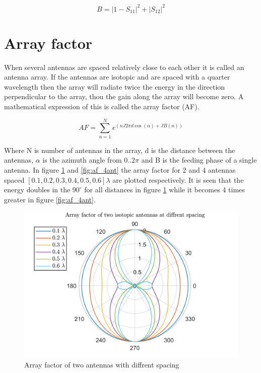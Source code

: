 \begin{equation} 
B = |1-S_{11}|^2 + |S_{12}|^2
\end{equation}



\section{Array factor}
When several antennas are spaced relatively close to each other it is called an antenna array. If the antennas are isotopic and are spaced with a quarter wavelength then the array will radiate twice the energy in the direction perpendicular to the array, thou the gain along the array will become zero. A mathematical expression of this is called the array factor (AF).

\begin{equation}
AF = \sum_{n=1}^{N} e^{(n J 2\pi d \cos(\alpha)+JB(n))}
\end{equation}

Where N is number of antennas in the array, d is the distance between the antennas, $\alpha$ is the azimuth angle from $0..2\pi$ and B is the feeding phase of a single antenna. In figure \ref{fig:af_2ant} and \ref{fig:af_4ant} the array factor for 2 and 4 antennas spaced $[0.1, 0.2, 0.3, 0.4, 0.5, 0.6]\lambda$ are plotted respectively. It is seen that the energy doubles in the $90^\circ$ for all distances in figure \ref{fig:af_2ant} while it becomes 4 times greater in figure \ref{fig:af_4ant}.   


\begin{figure}[H]
\centering 
\includegraphics[scale = 0.7]{figures/measurement/af_2ant.png}
\caption{Array factor of two antennas with diffrent spacing}
\label{fig:af_2ant}
\end{figure}


